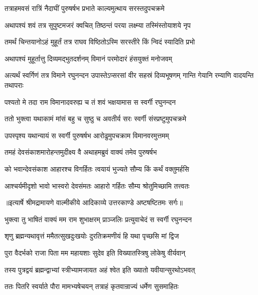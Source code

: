 \twolineshloka
{तत्राहमवसं रात्रिं नैदाघीं पुरुषर्षभ}
{प्रभाते काल्यमुत्थाय सरस्तदुपचक्रमे} %

\twolineshloka
{अथापश्यं शवं तत्र सुपुष्टमजरं क्वचित्}
{तिष्ठन्तं परया लक्ष्म्या तस्मिंस्तोयाशये नृप} %

\twolineshloka
{तमर्थं चिन्तयानोऽहं मुहूर्तं तत्र राघव}
{विष्ठितोऽस्मि सरस्तीरे किं न्विदं स्यादिति प्रभो} %

\twolineshloka
{अथापश्यं मुहूर्तात्तु दिव्यमद्भुतदर्शनम्}
{विमानं परमोदारं हंसयुक्तं मनोजवम्} %

\threelineshloka
{अत्यर्थं स्वर्गिणं तत्र विमाने रघुनन्दन}
{उपास्तेऽप्सरसां वीर सहस्रं दिव्यभूषणम्}
{गान्ति गेयानि रम्याणि वादयन्ति तथापराः} %

\twolineshloka
{पश्यतो मे तदा राम विमानादवरुह्य च}
{तं शवं भक्षयामास स स्वर्गी रघुनन्दन} %

\twolineshloka
{ततो भुक्त्वा यथाकामं मांसं बहु च सुष्ठु च}
{अवतीर्य सरः स्वर्गी संस्प्रष्टुमुपचक्रमे} %

\twolineshloka
{उपस्पृश्य यथान्यायं स स्वर्गी पुरुषर्षभ}
{आरोढुमुपचक्राम विमानवरमुत्तमम्} %

\twolineshloka
{तमहं देवसंकाशमारोहन्तमुदीक्ष्य वै}
{अथाहमब्रुवं वाक्यं तमेव पुरुषर्षभ} %

\twolineshloka
{को भवान्देवसंकाश आहारश्च विगर्हितः}
{त्वयायं भुज्यते सौम्य किं कर्थं वक्तुमर्हसि} %

\twolineshloka
{आश्चर्यमीदृशो भावो भास्वरो देवसंमतः}
{आहारो गर्हितः सौम्य श्रोतुमिच्छामि तत्त्वतः} %


{॥इत्यार्षे श्रीमद्रामायणे वाल्मीकीये आदिकाव्ये उत्तरकाण्डे अष्टषष्टितमः सर्गः॥}


\twolineshloka
{भुक्त्वा तु भाषितं वाक्यं मम राम शुभाक्षरम्}
{प्राञ्जलिः प्रत्युवाचेदं स स्वर्गी रघुनन्दन} %

\twolineshloka
{शृणु ब्रह्मन्यथावृत्तं ममैतत्सुखदुःखयोः}
{दुरतिक्रमणीयं हि यथा पृच्छसि मां द्विज} %

\twolineshloka
{पुरा वैदर्भको राजा पिता मम महायशाः}
{सुदेव इति विख्यातस्त्रिषु लोकेषु वीर्यवान्} %

\twolineshloka
{तस्य पुत्रद्वयं ब्रह्मन्द्वाभ्यां स्त्रीभ्यामजायत}
{अहं श्वेत इति ख्यातो यवीयान्सुरथोऽभवत्} %

\twolineshloka
{ततः पितरि स्वर्याते पौरा मामभ्यषेचयन्}
{तत्राहं कृतवान्राज्यं धर्मेण सुसमाहितः} %


